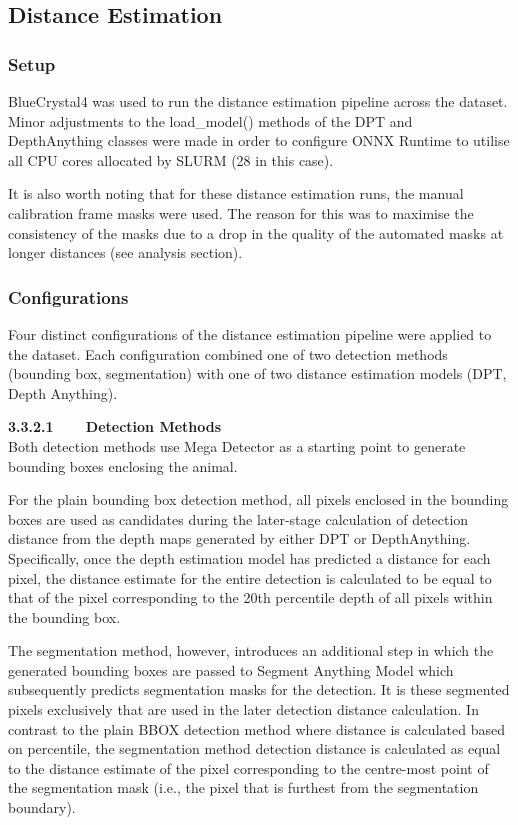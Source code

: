 \subsection{Distance Estimation}

\subsubsection{Setup}

BlueCrystal4 was used to run the distance estimation pipeline across the dataset.
Minor adjustments to the load\_model() methods of the DPT and DepthAnything classes
were made in order to configure ONNX Runtime to utilise all CPU cores allocated by
SLURM (28 in this case).

It is also worth noting that for these distance estimation runs, the manual calibration
frame masks were used.
The reason for this was to maximise the consistency of the masks due to a drop in the
quality of the automated masks at longer distances (see analysis section).

\subsubsection{Configurations}

Four distinct configurations of the distance estimation pipeline were applied to the
dataset.
Each configuration combined one of two detection methods (bounding box, segmentation) with one
of two distance estimation models (DPT, Depth Anything).

\vspace{3mm}

\textbf{3.3.2.1~~~~Detection Methods}\vspace{4.5mm}\\
Both detection methods use Mega Detector as a starting point to generate bounding boxes
enclosing the animal.

For the plain bounding box detection method, all pixels enclosed in the bounding boxes are used
as candidates during the later-stage calculation of detection distance from the depth maps
generated by either DPT or DepthAnything.
Specifically, once the depth estimation model has predicted a distance for each pixel, the
distance estimate for the entire detection is calculated to be equal to that of the pixel
corresponding to the 20th percentile depth of all pixels within the bounding box.

The segmentation method, however, introduces an additional step in which the generated bounding
boxes are passed to Segment Anything Model which subsequently predicts segmentation masks for
the detection.
It is these segmented pixels exclusively that are used in the later detection distance calculation.
In contrast to the plain BBOX detection method where distance is calculated based on
percentile, the segmentation method detection distance is calculated as equal to the distance
estimate of the pixel corresponding to the centre-most point of the segmentation mask (i.e., the pixel
that is furthest from the segmentation boundary).

